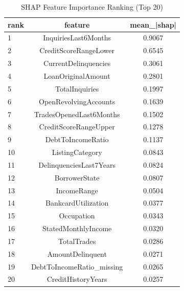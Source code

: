 \begin{table}
\centering
\caption{SHAP Feature Importance Ranking (Top 20)}
\label{tab:shap_ranking}
\begin{tabular}{lcc}
\toprule
rank & feature & mean_|shap| \\
\midrule
1 & InquiriesLast6Months & 0.9067 \\
2 & CreditScoreRangeLower & 0.6545 \\
3 & CurrentDelinquencies & 0.3061 \\
4 & LoanOriginalAmount & 0.2801 \\
5 & TotalInquiries & 0.1997 \\
6 & OpenRevolvingAccounts & 0.1639 \\
7 & TradesOpenedLast6Months & 0.1502 \\
8 & CreditScoreRangeUpper & 0.1278 \\
9 & DebtToIncomeRatio & 0.1137 \\
10 & ListingCategory & 0.0843 \\
11 & DelinquenciesLast7Years & 0.0824 \\
12 & BorrowerState & 0.0807 \\
13 & IncomeRange & 0.0504 \\
14 & BankcardUtilization & 0.0377 \\
15 & Occupation & 0.0343 \\
16 & StatedMonthlyIncome & 0.0320 \\
17 & TotalTrades & 0.0286 \\
18 & AmountDelinquent & 0.0271 \\
19 & DebtToIncomeRatio_missing & 0.0265 \\
20 & CreditHistoryYears & 0.0257 \\
\bottomrule
\end{tabular}
\end{table}
